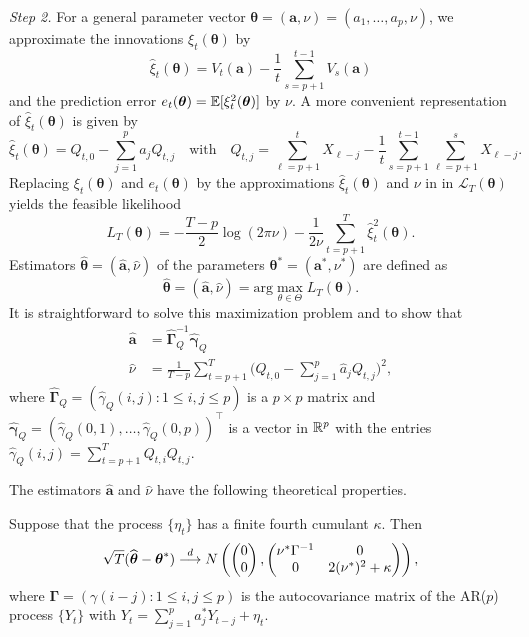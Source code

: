 \textit{Step 2.} For a general parameter vector $\boldsymbol{\theta} = (\boldsymbol{a},\nu) = (a_1,\ldots,a_p,\nu)$, we approximate the innovations $\xi_t(\boldsymbol{\theta})$ by 
\[ \widehat{\xi}_t(\boldsymbol{\theta}) = V_t(\boldsymbol{a}) - \frac{1}{t} \sum\limits_{s=p+1}^{t-1} V_s(\boldsymbol{a}) \]
and the prediction error $e_t(\boldsymbol{\theta}) = \mathbb{E}[ \xi_t^2(\boldsymbol{\theta})]$ by $\nu$. A more convenient representation of $\widehat{\xi}_t(\boldsymbol{\theta})$ is given by 
\[ \widehat{\xi}_t(\boldsymbol{\theta}) = Q_{t,0} - \sum\limits_{j=1}^p a_j Q_{t,j} \quad \text{with} \quad Q_{t,j} = \sum\limits_{\ell=p+1}^t X_{\ell-j} - \frac{1}{t} \sum\limits_{s=p+1}^{t-1} \sum\limits_{\ell=p+1}^s X_{\ell-j}. \]
Replacing $\xi_t(\boldsymbol{\theta})$ and $e_t(\boldsymbol{\theta})$ by the approximations $ \widehat{\xi}_t(\boldsymbol{\theta})$ and $\nu$ in in $\mathcal{L}_T(\boldsymbol{\theta})$ yields the feasible likelihood 
\[ L_T(\boldsymbol{\theta}) =  -\frac{T-p}{2} \log(2 \pi \nu) - \frac{1}{2 \nu} \sum\limits_{t=p+1}^T \widehat{\xi}_t^2(\boldsymbol{\theta}). \]
Estimators $\widehat{\boldsymbol{\theta}} = (\widehat{\boldsymbol{a}},\widehat{\nu})$ of the parameters $\boldsymbol{\theta}^* = (\boldsymbol{a}^*,\nu^*)$ are defined as
\[ \widehat{\boldsymbol{\theta}} = (\widehat{\boldsymbol{a}},\widehat{\nu}) = \text{arg} \max_{\theta \in \Theta} L_T(\boldsymbol{\theta}). \] 
It is straightforward to solve this maximization problem and to show that
\begin{align*}
\widehat{\boldsymbol{a}} & = \widehat{\boldsymbol{\Gamma}}_Q^{-1} \widehat{\boldsymbol{\gamma}}_Q \\
\widehat{\nu} & = \frac{1}{T-p} \sum\limits_{t=p+1}^T \Big( Q_{t,0} - \sum\limits_{j=1}^p \widehat{a}_j Q_{t,j} \Big)^2,
\end{align*}
where $\widehat{\boldsymbol{\Gamma}}_Q = (\widehat{\gamma}_Q(i,j): 1 \le i,j \le p)$ is a $p \times p$ matrix and $\widehat{\boldsymbol{\gamma}}_Q = (\widehat{\gamma}_Q(0,1),\ldots,\widehat{\gamma}_Q(0,p))^\top$ is a vector in $\mathbb{R}^p$ with the entries $\widehat{\gamma}_Q(i,j) = \sum_{t=p+1}^T Q_{t,i} Q_{t,j}$. 
\vspace{10pt}


The estimators $\widehat{\boldsymbol{a}}$ and $\widehat{\nu}$ have the following theoretical properties.
\begin{prop}\label{prop-ARMA}
Suppose that the process $\{ \eta_t\}$ has a finite fourth cumulant $\kappa$. Then 
\[ \sqrt{T} ( \widehat{\boldsymbol{\theta}} - \boldsymbol{\theta}^* ) \stackrel{d}{\longrightarrow} N \left( \begin{pmatrix} 0 \\ 0 \end{pmatrix}, \begin{pmatrix} \nu^* \Gamma^{-1} & 0 \\ 0 & 2 (\nu^*)^2 + \kappa \end{pmatrix} \right), \]
where $\boldsymbol{\Gamma} = (\gamma(i-j): 1 \le i,j \le p)$ is the autocovariance matrix of the AR($p$) process $\{ Y_t \}$ with $Y_t = \sum_{j=1}^p a_j^* Y_{t-j} + \eta_t$.  
\end{prop} 


